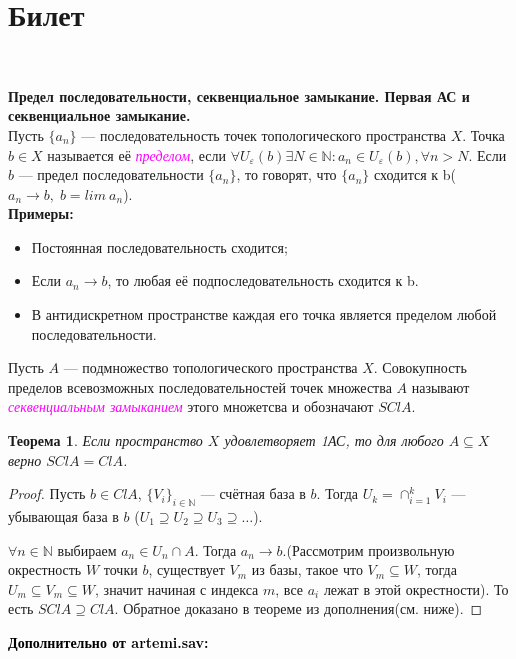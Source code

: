 \documentclass[a4paper,100pt]{article}
\theoremstyle{indented}
\newtheorem{theorem}{Теорема}
\begin{document}
\section{Билет} \

\medskip

\textbf{Предел последовательности, секвенциальное замыкание. Первая АС и секвенциальное замыкание.}\\
    
    Пусть $\{a_n\}$ --- последовательность точек топологического пространства $X$. Точка $b \in X$ называется её \textit{\textcolor{magenta}{пределом}}, если $\forall U_\varepsilon(b) \exists N \in \mathbb N: a_n \in U_\varepsilon(b), \forall n > N.$
    Если $b$ --- предел последовательности $\{a_n\}$, то говорят, что $\{a_n\}$ сходится к b($a_n \rightarrow b,\; b = lim \: a_n$).\\
    
    \textbf{Примеры:}
    \begin{itemize}
        \item Постоянная последовательность сходится;
        \item Если $a_n \rightarrow b$, то любая её подпоследовательность сходится к b.
        \item В антидискретном пространстве каждая его точка является пределом любой последовательности.
    \end{itemize}
    
    Пусть $A$ --- подмножество топологического пространства $X$. Совокупность пределов всевозможных последовательностей точек множества $A$ называют \textit{\textcolor{magenta}{секвенциальным замыканием}} этого множетсва и обозначают $SClA$.\\
    
    \begin{theorem}
        Если пространство $X$ удовлетворяет 1АС, то для любого $A \subseteq X$ верно $SClA = ClA$.
    \end{theorem}
    \begin{proof}
        Пусть $b \in ClA$, $\{V_i\}_{i\in \mathbb N}$ --- счётная база в $b$. Тогда $U_k = \cap_{i=1}^k V_i$ --- убывающая база в $b$ ($U_1 \supseteq U_2 \supseteq U_3 \supseteq \dots$).
        
        $\forall n \in \mathbb N$ выбираем $a_n \in U_n \cap A.$ Тогда $a_n \rightarrow b.$(Рассмотрим произвольную окрестность $W$ точки $b$, существует $V_m$ из базы, такое что $V_m \subseteq W$, тогда $U_m \subseteq V_m \subseteq W$, значит начиная с индекса $m$, все $a_i$ лежат в этой окрестности). То есть $SClA \supseteq ClA$.
        Обратное доказано в теореме из дополнения(см. ниже).
     \end{proof}
     \textbf{\textcolor{black}{Дополнительно от artemi.sav:}}\\
     
\end{document}

